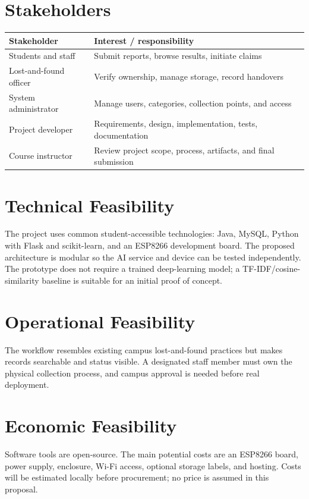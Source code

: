 \documentclass[12pt,a4paper]{report}
\begin{document}
\section{Stakeholders}
\begin{longtable}{p{}p{}}
\toprule
Stakeholder & Interest / responsibility\\\midrule
Students and staff & Submit reports, browse results, initiate claims\\
Lost-and-found officer & Verify ownership, manage storage, record handovers\\
System administrator & Manage users, categories, collection points, and access\\
Project developer & Requirements, design, implementation, tests, documentation\\
Course instructor & Review project scope, process, artifacts, and final submission\\
\bottomrule
\end{longtable}

\section{Technical Feasibility}
The project uses common student-accessible technologies: Java, MySQL, Python with Flask and scikit-learn, and an ESP8266 development board. The proposed architecture is modular so the AI service and device can be tested independently. The prototype does not require a trained deep-learning model; a TF-IDF/cosine-similarity baseline is suitable for an initial proof of concept.

\section{Operational Feasibility}
The workflow resembles existing campus lost-and-found practices but makes records searchable and status visible. A designated staff member must own the physical collection process, and campus approval is needed before real deployment.

\section{Economic Feasibility}
Software tools are open-source. The main potential costs are an ESP8266 board, power supply, enclosure, Wi-Fi access, optional storage labels, and hosting. Costs will be estimated locally before procurement; no price is assumed in this proposal.
\end{document}
